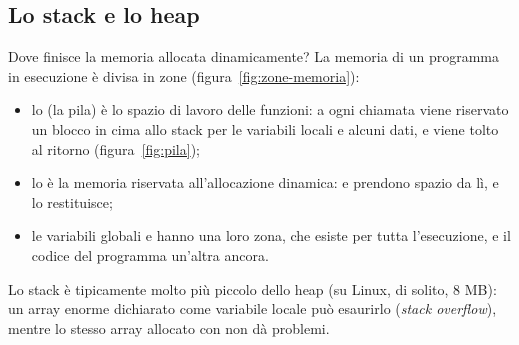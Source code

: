 
\subsection{Lo stack e lo heap}

Dove finisce la memoria allocata dinamicamente? La memoria di un programma
in esecuzione è divisa in zone (figura~\ref{fig:zone-memoria}):

\begin{itemize}
  \item lo  (la pila) è lo spazio di lavoro delle funzioni:
        a ogni chiamata viene riservato un blocco in cima allo stack per le
        variabili locali e alcuni dati, e viene tolto al ritorno
        (figura~\ref{fig:pila});
  \item lo  è la memoria riservata all'allocazione dinamica:
         e  prendono spazio da lì, e 
        lo restituisce;
  \item le variabili globali e  hanno una loro zona, che esiste
        per tutta l'esecuzione, e il codice del programma un'altra ancora.
\end{itemize}

Lo stack è tipicamente molto più piccolo dello heap (su Linux, di solito, 8
MB): un array enorme dichiarato come variabile locale può esaurirlo
(\textit{stack overflow}), mentre lo stesso array allocato con
 non dà problemi.

